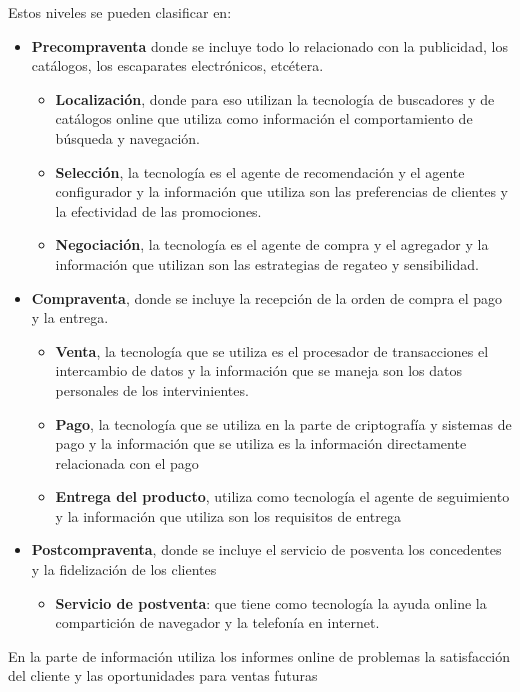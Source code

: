 \documentclass[12pt, twoside, openright]{report} %
\begin{document}
Estos niveles se pueden clasificar en:
\begin{itemize}
	\item \textbf{Precompraventa} donde se incluye todo lo relacionado con la publicidad, los catálogos, los escaparates electrónicos, etcétera.
	\begin{itemize}
		\item \textbf{Localización}, donde para eso utilizan la tecnología de buscadores y de catálogos online que utiliza como información el comportamiento de búsqueda y navegación.
		\item \textbf{Selección}, la tecnología es el agente de recomendación y el agente configurador y la información que utiliza son las preferencias de clientes y la efectividad de las promociones.
		\item \textbf{Negociación}, la tecnología es el agente de compra y el agregador y la información que utilizan son las estrategias de regateo y sensibilidad.
	\end{itemize}
	
	\item \textbf{Compraventa}, donde se incluye la recepción de la orden de compra el pago y la entrega.
	\begin{itemize}
		\item \textbf{Venta}, la tecnología que se utiliza es el procesador de transacciones el intercambio de datos y la información que se maneja son los datos personales de los intervinientes.
		\item \textbf{Pago}, la tecnología que se utiliza en la parte de criptografía y sistemas de pago y la información que se utiliza es la información directamente relacionada con el pago
		\item \textbf{Entrega del producto}, utiliza como tecnología el agente de seguimiento y la información que utiliza son los requisitos de entrega
	\end{itemize}
	\item \textbf{Postcompraventa}, donde se incluye el servicio de posventa los concedentes y la fidelización de los clientes
	\begin{itemize}
		\item \textbf{Servicio de postventa}: que tiene como tecnología la ayuda online la compartición de navegador y la telefonía en internet.
	\end{itemize}
\end{itemize}
En la parte de información utiliza los informes online de problemas la satisfacción del cliente y las oportunidades para ventas futuras
\end{document}
